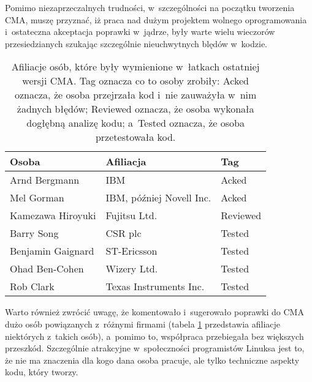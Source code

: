 Pomimo niezaprzeczalnych trudności, w~szczególności na początku
tworzenia CMA, muszę przyznać, iż praca nad dużym projektem wolnego
oprogramowania i~ostateczna akceptacja poprawki w~jądrze, były warte
wielu wieczorów przesiedzianych szukając szczególnie nieuchwytnych
blędów w~kodzie.

\begin{table}[htbp]
\begin{center}
\begin{tabular}{lll}
Osoba             & Afiliacja                & Tag \\
\hline
Arnd Bergmann     & IBM                      & Acked \\
Mel Gorman        & IBM, później Novell Inc. & Acked \\
Kamezawa Hiroyuki & Fujitsu Ltd.             & Reviewed \\
Barry Song        & CSR plc                  & Tested \\
Benjamin Gaignard & ST-Ericsson              & Tested \\
Ohad Ben-Cohen    & Wizery Ltd.              & Tested \\
Rob Clark         & Texas Instruments Inc.   & Tested \\
\end{tabular}
\end{center}
\caption{Afiliacje osób, które były wymienione w~łatkach ostatniej
  wersji CMA.  Tag oznacza co to osoby zrobiły: Acked oznacza, że
  osoba przejrzała kod i~nie zauważyła w~nim żadnych błędów; Reviewed
  oznacza, że osoba wykonała dogłębną analizę kodu; a~Tested oznacza,
  że osoba przetestowała kod.}
\label{tab:cma-ppl}
\end{table}

Warto również zwrócić uwagę, że komentowało i~sugerowało poprawki do
CMA dużo osób powiązanych z~różnymi firmami (tabela \ref{tab:cma-ppl}
przedstawia afiliacje niektórych z~takich osób), a~pomimo to,
współpraca przebiegała bez większych przeszkód.  Szczególnie
atrakcyjne w~społeczności programistów Linuksa jest to, że nie ma
znaczenia dla kogo dana osoba pracuje, ale tylko techniczne aspekty
kodu, który tworzy.
